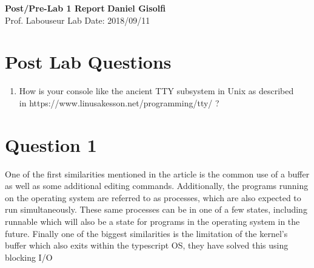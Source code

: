 \documentclass[a4paper, 11pt]{article}
\begin{document}
\noindent
\large\textbf{Post/Pre-Lab 1 Report} \hfill \textbf{Daniel Gisolfi} \\
Prof. Labouseur \hfill Lab Date: 2018/09/11\\

\section*{Post Lab Questions}

\begin{enumerate}
\item How is your console like the ancient TTY subsystem in Unix as described\\
in https://www.linusakesson.net/programming/tty/ ? 
\end{enumerate}

\section*{Question 1}

One of the first similarities mentioned in the article is the common use of a buffer as well as some additional editing commands. 
Additionally, the programs running on the operating system are referred to as processes, which are also expected to run simultaneously.
These same processes can be in one of a few states, including runnable which will also be a state for programs in the operating system in the future. 
Finally one of the biggest similarities is the limitation of the kernel's buffer which also exits within the typescript OS, they have solved this using blocking I/O
\end{document}
